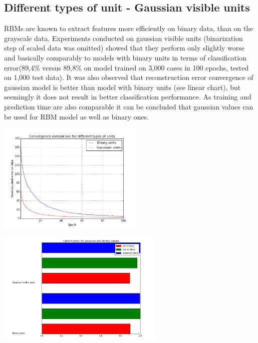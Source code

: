 \documentclass[a4paper]{scrartcl}
\begin{document}
\subsection{Different types of unit - Gaussian visible units}
RBMs are known to extract features more efficiently on binary data, than on the grayscale data. Experiments conducted on gaussian visible units (binarization step of scaled data was omitted) showed that they perform only slightly worse and basically comparably to models with binary units in terms of classification error(89,4\% versus 89,8\% on model trained on 3,000 cases in 100 epochs, tested on 1,000 test data). It was also observed that reconstruction error convergence of gaussian model is better than model with binary units (see linear chart), but seemingly it does not result in better classification performance. As training and prediction time are also comparable it can be concluded that gaussian values can be used for RBM model as well as binary ones. 

\begin{minipage}[t]{0.5\textwidth}

\includegraphics[width=7cm]{images/dataTypes.png}

\end{minipage}
\begin{minipage}[t]{0.5\textwidth}

\includegraphics[width=8cm]{images/gaussian_binary.png}

\end{minipage}
\end{document}
